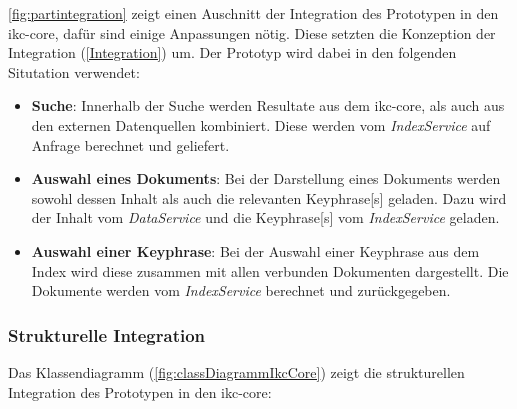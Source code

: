\autoref{fig:partintegration} zeigt einen Auschnitt der Integration des Prototypen in den \gls{ikc-core}, dafür sind einige Anpassungen nötig. Diese setzten die Konzeption der Integration (\autoref{Integration}) um. Der Prototyp wird dabei in den folgenden Situtation verwendet:
\begin{itemize}
    \item \textbf{Suche}: Innerhalb der Suche werden Resultate aus dem \gls{ikc-core}, als auch aus den  externen Datenquellen kombiniert. Diese werden vom \textit{IndexService} auf Anfrage berechnet und geliefert. 
    \item \textbf{Auswahl eines Dokuments}: Bei der Darstellung eines Dokuments werden sowohl dessen Inhalt als auch die relevanten \gls{Keyphrase}[s] geladen. Dazu wird der Inhalt vom \textit{DataService} und die \gls{Keyphrase}[s] vom \textit{IndexService} geladen.
    \item \textbf{Auswahl einer \gls{Keyphrase}}: Bei der Auswahl einer \gls{Keyphrase} aus dem Index wird diese zusammen mit allen verbunden Dokumenten dargestellt. Die Dokumente werden vom \textit{IndexService} berechnet und zurückgegeben.
\end{itemize}

\subsubsection{Strukturelle Integration}

Das Klassendiagramm (\autoref{fig:classDiagrammIkcCore}) zeigt die strukturellen Integration des Prototypen in den \gls{ikc-core}: 

